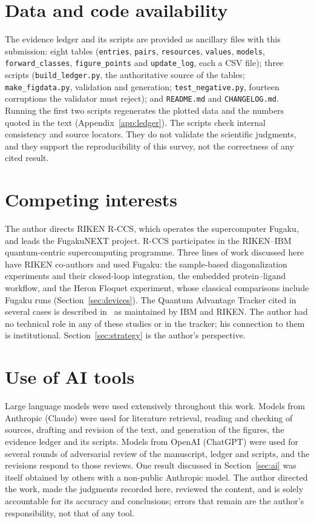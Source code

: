 \documentclass[10pt,a4paper]{article}
\begin{document}
\section*{Data and code availability}
The evidence ledger and its scripts are provided as ancillary files with this submission: eight tables (\texttt{entries}, \texttt{pairs}, \texttt{resources}, \texttt{values}, \texttt{models}, \texttt{forward\_classes}, \texttt{figure\_points} and \texttt{update\_log}, each a CSV file); three scripts (\texttt{build\_ledger.py}, the authoritative source of the tables; \texttt{make\_figdata.py}, validation and generation; \texttt{test\_negative.py}, fourteen corruptions the validator must reject); and \texttt{README.md} and \texttt{CHANGELOG.md}. Running the first two scripts regenerates the plotted data and the numbers quoted in the text (Appendix~\ref{app:ledger}). The scripts check internal consistency and source locators. They do not validate the scientific judgments, and they support the reproducibility of this survey, not the correctness of any cited result.

\section*{Competing interests}
The author directs RIKEN R-CCS, which operates the supercomputer Fugaku, and leads the FugakuNEXT project. R-CCS participates in the RIKEN--IBM quantum-centric supercomputing programme. Three lines of work discussed here have RIKEN co-authors and used Fugaku: the sample-based diagonalization experiments and their closed-loop integration, the embedded protein--ligand workflow, and the Heron Floquet experiment, whose classical comparisons include Fugaku runs (Section~\ref{sec:devices}). The Quantum Advantage Tracker cited in several cases is described in~\cite{legeza2026} as maintained by IBM and RIKEN. The author had no technical role in any of these studies or in the tracker; his connection to them is institutional. Section~\ref{sec:strategy} is the author's perspective.

\section*{Use of AI tools}
Large language models were used extensively throughout this work. Models from Anthropic (Claude) were used for literature retrieval, reading and checking of sources, drafting and revision of the text, and generation of the figures, the evidence ledger and its scripts. Models from OpenAI (ChatGPT) were used for several rounds of adversarial review of the manuscript, ledger and scripts, and the revisions respond to those reviews. One result discussed in Section~\ref{sec:ai} was itself obtained by others with a non-public Anthropic model. The author directed the work, made the judgments recorded here, reviewed the content, and is solely accountable for its accuracy and conclusions; errors that remain are the author's responsibility, not that of any tool.
\appendix
\end{document}

